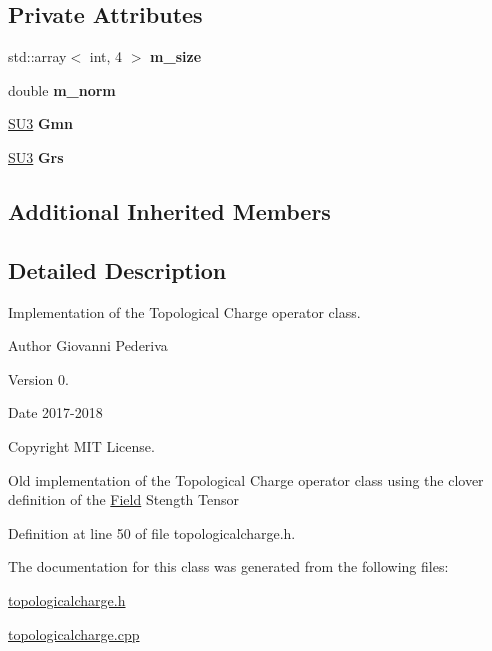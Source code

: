 \subsection*{Private Attributes}
\begin{DoxyCompactItemize}
\item 
std\+::array$<$ int, 4 $>$ {\bfseries m\+\_\+size}\hypertarget{classTopologicalCharge_a7c710f7c182d1255533438fb343cf8ee}{}\label{classTopologicalCharge_a7c710f7c182d1255533438fb343cf8ee}

\item 
double {\bfseries m\+\_\+norm}\hypertarget{classTopologicalCharge_a35210a65883371d53d0eecbf90ef3ffd}{}\label{classTopologicalCharge_a35210a65883371d53d0eecbf90ef3ffd}

\item 
\hyperlink{structSU3}{S\+U3} {\bfseries Gmn}\hypertarget{classTopologicalCharge_a428ef097640a91fe39c3b2936cd64ad0}{}\label{classTopologicalCharge_a428ef097640a91fe39c3b2936cd64ad0}

\item 
\hyperlink{structSU3}{S\+U3} {\bfseries Grs}\hypertarget{classTopologicalCharge_a65cd1f2ba971ec5e92b60188b94b1a33}{}\label{classTopologicalCharge_a65cd1f2ba971ec5e92b60188b94b1a33}

\end{DoxyCompactItemize}
\subsection*{Additional Inherited Members}


\subsection{Detailed Description}
Implementation of the Topological Charge operator class. 

\begin{DoxyAuthor}{Author}
Giovanni Pederiva 
\end{DoxyAuthor}
\begin{DoxyVersion}{Version}
0. 
\end{DoxyVersion}
\begin{DoxyDate}{Date}
2017-\/2018 
\end{DoxyDate}
\begin{DoxyCopyright}{Copyright}
M\+IT License.
\end{DoxyCopyright}
Old implementation of the Topological Charge operator class using the clover definition of the \hyperlink{classField}{Field} Stength Tensor 

Definition at line 50 of file topologicalcharge.\+h.



The documentation for this class was generated from the following files\+:\begin{DoxyCompactItemize}
\item 
\hyperlink{topologicalcharge_8h}{topologicalcharge.\+h}\item 
\hyperlink{topologicalcharge_8cpp}{topologicalcharge.\+cpp}\end{DoxyCompactItemize}
